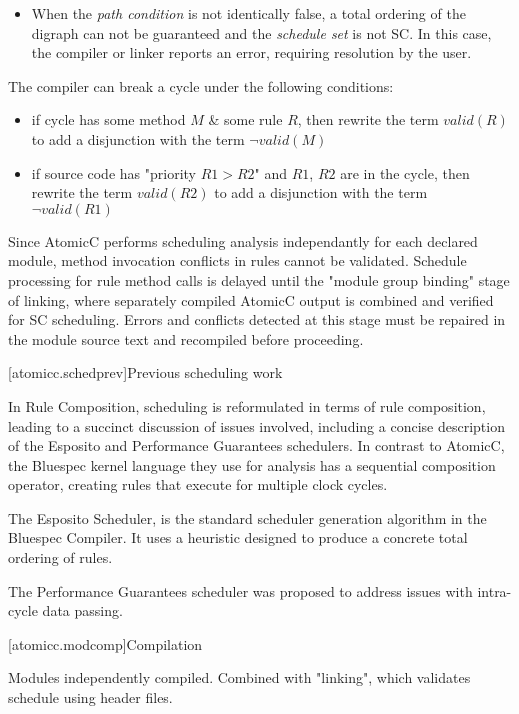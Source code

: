 \begin{itemize}
\item When the \textit{path condition} is not identically false, a total ordering of
the digraph can not be guaranteed and the \textit{schedule set} is not SC.
In this case, the compiler or linker reports an error,
requiring resolution by the user.
\end{itemize}

The compiler can break a cycle under the following conditions:
\begin{itemize}
\item if cycle has some method $M$ \& some rule $R$, then
rewrite the term $valid(R)$ to add a disjunction with the term $\neg valid(M)$
\item if source code has "priority $R1 > R2$" and $R1$, $R2$ are in the cycle, then
rewrite the term $valid(R2)$ to add a disjunction with the term $\neg valid(R1)$
\end{itemize}

Since AtomicC performs scheduling analysis independantly for each
declared module, method invocation conflicts in rules cannot be validated.
Schedule processing for rule method calls is delayed until the "module group binding"
stage of linking, where separately compiled AtomicC output is combined and
verified
for SC scheduling.  Errors and conflicts detected at this stage must be repaired
in the module source text and recompiled before proceeding.

[atomicc.schedprev]{Previous scheduling work}

In Rule Composition\cite{Dave2007}, scheduling
is reformulated in terms of rule composition, leading to a succinct discussion
of issues involved, including a concise description of the Esposito and
Performance Guarantees schedulers.
In contrast to AtomicC, the Bluespec kernel language they use
for analysis has a sequential composition operator, creating rules
that execute for multiple clock cycles.

The Esposito Scheduler\cite{Esposito:Patent,Dave2007},
is the standard scheduler generation algorithm in the Bluespec Compiler.
It uses a heuristic designed to produce a concrete total ordering of rules.

The Performance Guarantees scheduler\cite{Rosenband:PerformanceGuarantees}
was proposed to address issues with intra-cycle data passing.

[atomicc.modcomp]{Compilation}

Modules independently compiled.  Combined with "linking", which validates schedule using header files.

